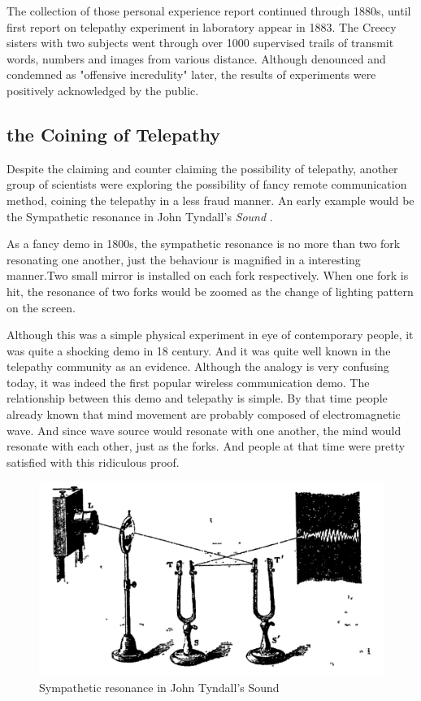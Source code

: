 \documentclass[a4paper]{article}
\begin{document}
The collection of those personal experience report continued through 1880s, until first report on telepathy experiment in laboratory appear in 1883. The Creecy sisters with two subjects went through over 1000 supervised trails \autocite{luckhurst2002invention} of transmit words, numbers and images from various distance. Although denounced and condemned as "offensive incredulity" later, the results of experiments were positively acknowledged by the public.

\subsection{the Coining of Telepathy}

Despite the claiming and counter claiming the possibility of telepathy, another group of scientists were exploring the possibility of fancy remote communication method, coining the telepathy in a less fraud manner. An early example would be the Sympathetic resonance in John Tyndall's \textit{Sound} \autocite{tyndall1897sound}.

As a fancy demo in 1800s, the sympathetic resonance is no more than two fork resonating one another, just the behaviour is magnified in a interesting manner.Two small mirror is installed on each fork respectively. When one fork is hit, the resonance of two forks would be zoomed as the change of lighting pattern on the screen. 

Although this was a simple physical experiment in eye of contemporary people, it was quite a shocking demo in 18 century. And it was quite well known in the telepathy community as an evidence. Although the analogy is very confusing today, it was indeed the first popular wireless communication demo. The relationship between this demo and telepathy is simple. By that time people already known that mind movement are probably composed of electromagnetic wave. And since wave source would resonate with one another, the mind would resonate with each other, just as the forks. And people at that time were pretty satisfied with this ridiculous proof.

\begin{figure}
	\centering
	\includegraphics[width= \linewidth]{Sound1}
	\caption{Sympathetic resonance in John Tyndall's Sound}
	\label{fig:Sound1}
\end{figure}
\end{document}
